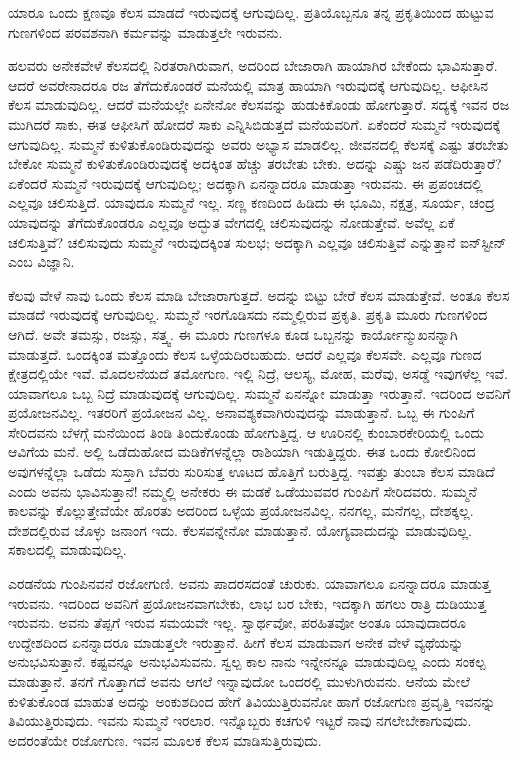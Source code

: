 {\small ಯಾರೂ ಒಂದು ಕ್ಷಣವೂ ಕೆಲಸ ಮಾಡದೆ ಇರುವುದಕ್ಕೆ ಆಗುವುದಿಲ್ಲ. ಪ್ರತಿಯೊಬ್ಬನೂ ತನ್ನ ಪ್ರಕೃತಿಯಿಂದ ಹುಟ್ಟುವ ಗುಣಗಳಿಂದ ಪರವಶನಾಗಿ ಕರ್ಮವನ್ನು ಮಾಡುತ್ತಲೇ ಇರುವನು.}

ಹಲವರು ಅನೇಕವೇಳೆ ಕೆಲಸದಲ್ಲಿ ನಿರತರಾಗಿರುವಾಗ, ಅದರಿಂದ ಬೇಜಾರಾಗಿ ಹಾಯಾಗಿರ ಬೇಕೆಂದು ಭಾವಿಸುತ್ತಾರೆ. ಆದರೆ ಅವರೇನಾದರೂ ರಜ ತೆಗೆದುಕೊಂಡರೆ ಮನೆಯಲ್ಲಿ ಮಾತ್ರ ಹಾಯಾಗಿ ಇರುವುದಕ್ಕೆ ಆಗುವುದಿಲ್ಲ. ಆಫೀಸಿನ ಕೆಲಸ ಮಾಡುವುದಿಲ್ಲ. ಆದರೆ ಮನೆಯಲ್ಲೇ ಏನೇನೋ ಕೆಲಸವನ್ನು ಹುಡುಕಿಕೊಂಡು ಹೋಗುತ್ತಾರೆ. ಸದ್ಯಕ್ಕೆ ಇವನ ರಜ ಮುಗಿದರೆ ಸಾಕು, ಈತ ಆಫೀಸಿಗೆ ಹೋದರೆ ಸಾಕು ಎನ್ನಿಸಿಬಿಡುತ್ತದೆ ಮನೆಯವರಿಗೆ. ಏಕೆಂದರೆ ಸುಮ್ಮನೆ ಇರುವುದಕ್ಕೆ ಆಗುವುದಿಲ್ಲ. ಸುಮ್ಮನೆ ಕುಳಿತುಕೊಂಡಿರುವುದನ್ನು ಅವರು ಅಭ್ಯಾಸ ಮಾಡಲಿಲ್ಲ. ಜೀವನದಲ್ಲಿ ಕೆಲಸಕ್ಕೆ ಎಷ್ಟು ತರಬೇತು ಬೇಕೋ ಸುಮ್ಮನೆ ಕುಳಿತುಕೊಂಡಿರುವುದಕ್ಕೆ ಅದಕ್ಕಿಂತ ಹೆಚ್ಚು ತರಬೇತು ಬೇಕು. ಅದನ್ನು ಎಷ್ಚು ಜನ ಪಡೆದಿರುತ್ತಾರೆ? ಏಕೆಂದರೆ ಸುಮ್ಮನೆ ಇರುವುದಕ್ಕೆ ಆಗುವುದಿಲ್ಲ; ಅದಕ್ಕಾಗಿ ಏನನ್ನಾದರೂ ಮಾಡುತ್ತಾ ಇರುವನು. ಈ ಪ್ರಪಂಚದಲ್ಲಿ ಎಲ್ಲವೂ ಚಲಿಸುತ್ತಿದೆ. ಯಾವುದೂ ಸುಮ್ಮನೆ ಇಲ್ಲ. ಸಣ್ಣ ಕಣದಿಂದ ಹಿಡಿದು ಈ ಭೂಮಿ, ನಕ್ಷತ್ರ, ಸೂರ್ಯ, ಚಂದ್ರ ಯಾವುದನ್ನು ತೆಗೆದುಕೊಂಡರೂ ಎಲ್ಲವೂ ಅದ್ಭುತ ವೇಗದಲ್ಲಿ ಚಲಿಸುವುದನ್ನು ನೋಡುತ್ತೇವೆ. ಅವೆಲ್ಲ ಏಕೆ ಚಲಿಸುತ್ತಿವೆ? ಚಲಿಸುವುದು ಸುಮ್ಮನೆ ಇರುವುದಕ್ಕಿಂತ ಸುಲಭ; ಅದಕ್ಕಾಗಿ ಎಲ್ಲವೂ ಚಲಿಸುತ್ತಿವೆ ಎನ್ನುತ್ತಾನೆ ಐನ್​ಸ್ಟೀನ್ ಎಂಬ ವಿಜ್ಞಾನಿ.

ಕೆಲವು ವೇಳೆ ನಾವು ಒಂದು ಕೆಲಸ ಮಾಡಿ ಬೇಜಾರಾಗುತ್ತದೆ. ಅದನ್ನು ಬಿಟ್ಟು ಬೇರೆ ಕೆಲಸ ಮಾಡುತ್ತೇವೆ. ಅಂತೂ ಕೆಲಸ ಮಾಡದೆ ಇರುವುದಕ್ಕೆ ಆಗುವುದಿಲ್ಲ. ಸುಮ್ಮನೆ ಇರಗೊಡಿಸದು ನಮ್ಮಲ್ಲಿರುವ ಪ್ರಕೃತಿ. ಪ್ರಕೃತಿ ಮೂರು ಗುಣಗಳಿಂದ ಆಗಿದೆ. ಅವೇ ತಮಸ್ಸು, ರಜಸ್ಸು, ಸತ್ತ್ವ. ಈ ಮೂರು ಗುಣಗಳೂ ಕೂಡ ಒಬ್ಬನನ್ನು ಕಾರ್ಯೋನ್ಮುಖನನ್ನಾಗಿ ಮಾಡುತ್ತದೆ. ಒಂದಕ್ಕಿಂತ ಮತ್ತೊಂದು ಕೆಲಸ ಒಳ್ಳೆಯದಿರಬಹುದು. ಆದರೆ ಎಲ್ಲವೂ ಕೆಲಸವೇ. ಎಲ್ಲವೂ ಗುಣದ ಕ್ಷೇತ್ರದಲ್ಲಿಯೇ ಇವೆ. ಮೊದಲನೆಯದೆ ತಮೋಗುಣ. ಇಲ್ಲಿ ನಿದ್ರೆ, ಆಲಸ್ಯ, ಮೋಹ, ಮರೆವು, ಅಸಡ್ಡೆ ಇವುಗಳೆಲ್ಲ ಇವೆ. ಯಾವಾಗಲೂ ಒಬ್ಬ ನಿದ್ರೆ ಮಾಡುವುದಕ್ಕೆ ಆಗುವುದಿಲ್ಲ. ಸುಮ್ಮನೆ ಏನನ್ನೋ ಮಾಡುತ್ತಾ ಇರುತ್ತಾನೆ. ಇದರಿಂದ ಅವನಿಗೆ ಪ್ರಯೋಜನವಿಲ್ಲ. ಇತರರಿಗೆ ಪ್ರಯೋಜನ ವಿಲ್ಲ. ಅನಾವಶ್ಯಕವಾಗಿರುವುದನ್ನು ಮಾಡುತ್ತಾನೆ. ಒಬ್ಬ ಈ ಗುಂಪಿಗೆ ಸೇರಿದವನು ಬೆಳಗ್ಗೆ ಮನೆಯಿಂದ ತಿಂಡಿ ತಿಂದುಕೊಂಡು ಹೋಗುತ್ತಿದ್ದ. ಆ ಊರಿನಲ್ಲಿ ಕುಂಬಾರಕೇರಿಯಲ್ಲಿ ಒಂದು ಆವಿಗೆಯ ಮನೆ. ಅಲ್ಲಿ ಒಡೆದುಹೋದ ಮಡಿಕೆಗಳನ್ನೆಲ್ಲಾ ರಾಶಿಯಾಗಿ ಇಡುತ್ತಿದ್ದರು. ಈತ ಒಂದು ಕೋಲಿನಿಂದ ಅವುಗಳನ್ನೆಲ್ಲಾ ಒಡೆದು ಸುಸ್ತಾಗಿ ಬೆವರು ಸುರಿಸುತ್ತ ಊಟದ ಹೊತ್ತಿಗೆ ಬರುತ್ತಿದ್ದ. ಇವತ್ತು ತುಂಬಾ ಕೆಲಸ ಮಾಡಿದೆ ಎಂದು ಅವನು ಭಾವಿಸುತ್ತಾನೆ! ನಮ್ಮಲ್ಲಿ ಅನೇಕರು ಈ ಮಡಕೆ ಒಡೆಯುವವರ ಗುಂಪಿಗೆ ಸೇರಿದವರು. ಸುಮ್ಮನೆ ಕಾಲವನ್ನು ಕೊಲ್ಲುತ್ತೇವೆಯೇ ಹೊರತು ಅದರಿಂದ ಒಳ್ಳೆಯ ಪ್ರಯೋಜನವಿಲ್ಲ. ನನಗಲ್ಲ, ಮನೆಗಲ್ಲ, ದೇಶಕ್ಕಲ್ಲ. ದೇಶದಲ್ಲಿರುವ ಜೊಳ್ಳು ಜನಾಂಗ ಇದು. ಕೆಲಸವನ್ನೇನೋ ಮಾಡುತ್ತಾನೆ. ಯೋಗ್ಯವಾದುದನ್ನು ಮಾಡುವುದಿಲ್ಲ. ಸಕಾಲದಲ್ಲಿ ಮಾಡುವುದಿಲ್ಲ.

ಎರಡನೆಯ ಗುಂಪಿನವನೆ ರಜೋಗುಣಿ. ಅವನು ಪಾದರಸದಂತೆ ಚುರುಕು. ಯಾವಾಗಲೂ ಏನನ್ನಾದರೂ ಮಾಡುತ್ತ ಇರುವನು. ಇದರಿಂದ ಅವನಿಗೆ ಪ್ರಯೋಜನವಾಗಬೇಕು, ಲಾಭ ಬರ ಬೇಕು, ಇದಕ್ಕಾಗಿ ಹಗಲು ರಾತ್ರಿ ದುಡಿಯುತ್ತ ಇರುವನು. ಅವನು ತೆಪ್ಪಗೆ ಇರುವ ಸಮಯವೇ ಇಲ್ಲ. ಸ್ವಾರ್ಥವೋ, ಪರಹಿತವೋ ಅಂತೂ ಯಾವುದಾದರೂ ಉದ್ದೇಶದಿಂದ ಏನನ್ನಾದರೂ ಮಾಡುತ್ತಲೇ ಇರುತ್ತಾನೆ. ಹೀಗೆ ಕೆಲಸ ಮಾಡುವಾಗ ಅನೇಕ ವೇಳೆ ವ್ಯಥೆಯನ್ನು ಅನುಭವಿಸುತ್ತಾನೆ. ಕಷ್ಟವನ್ನೂ ಅನುಭವಿಸುವನು. ಸ್ವಲ್ಪ ಕಾಲ ನಾನು ಇನ್ನೇನನ್ನೂ ಮಾಡುವುದಿಲ್ಲ ಎಂದು ಸಂಕಲ್ಪ ಮಾಡುತ್ತಾನೆ. ತನಗೆ ಗೊತ್ತಾಗದೆ ಅವನು ಆಗಲೆ ಇನ್ನಾವುದೋ ಒಂದರಲ್ಲಿ ಮುಳುಗಿರುವನು. ಆನೆಯ ಮೇಲೆ ಕುಳಿತುಕೊಂಡ ಮಾಹುತ ಅದನ್ನು ಅಂಕುಶದಿಂದ ಹೇಗೆ ತಿವಿಯುತ್ತಿರುವನೋ ಹಾಗೆ ರಜೋಗುಣ ಪ್ರವೃತ್ತಿ ಇವನನ್ನು ತಿವಿಯುತ್ತಿರುವುದು. ಇವನು ಸುಮ್ಮನೆ ಇರಲಾರ. ಇನ್ನೊಬ್ಬರು ಕಚಗುಳಿ ಇಟ್ಟರೆ ನಾವು ನಗಲೇಬೇಕಾಗುವುದು. ಅದರಂತೆಯೇ ರಜೋಗುಣ. ಇವನ ಮೂಲಕ ಕೆಲಸ ಮಾಡಿಸುತ್ತಿರುವುದು.

